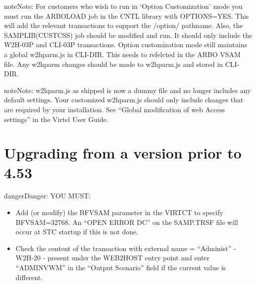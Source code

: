 \documentclass[letterpaper,10pt,english]{sphinxmanual}
\begin{document}
\begin{sphinxadmonition}{note}{Note:}
For customers who wish to run in ‘Option Customization’ mode you must run the ARBOLOAD job in the CNTL library with OPTIONS=YES. This will add the relevant transactions to support the /option/ pathname. Also, the SAMPLIB(CUSTCSS) job should be modified and run. It should only include the W2H-03P and CLI-03P transactions. Option customization mode still maintains a global w2hparm.js in CLI-DIR. This needs to refelcted in the ARBO VSAM file. Any w2hparm changes should be made to w2hparm.js and stored in CLI-DIR.
\end{sphinxadmonition}

\begin{sphinxadmonition}{note}{Note:}
w2hparm.js as shipped is now a dummy file and no longer includes any default settings. Your customized w2hparm.js should only include changes that are required by your installation. See “Global modification of web Access settings” in the Virtel User Guide.
\end{sphinxadmonition}

\ignorespaces 

\section{Upgrading from a version prior to 4.53}
\label{\detokenize{Migration_Guide:upgrading-from-a-version-prior-to-4-53}}\label{\detokenize{Migration_Guide:index-3}}
\begin{sphinxadmonition}{danger}{Danger:}
YOU MUST:
\end{sphinxadmonition}
\begin{itemize}
\item {} 
Add (or modify) the BFVSAM parameter in the VIRTCT to specify BFVSAM=32768. An “OPEN ERROR DC” on the SAMP.TRSF file will occur at STC startup if this is not done.

\item {} 
Check the content of the transaction with external name = “Administ” - W2H-20 - present under the WEB2HOST entry point and enter “ADMINVWM” in the “Output Scenario” field if the current value is different.

\end{itemize}
\end{document}
